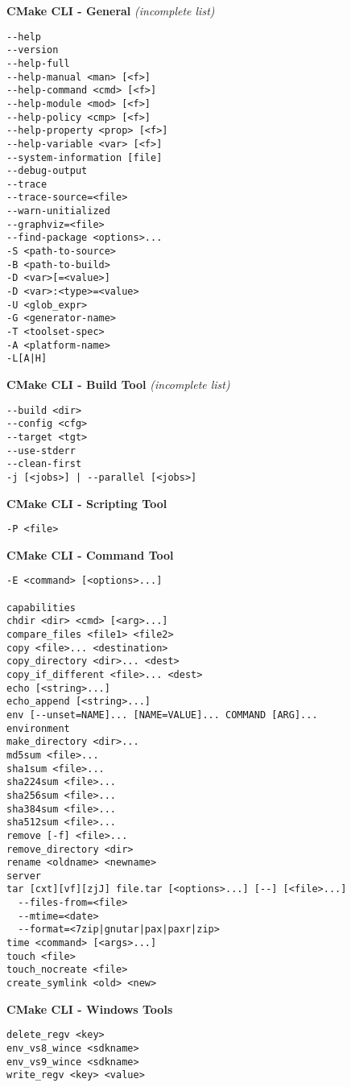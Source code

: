 \documentclass{article}
\begin{document}
\begin{minipage}[t]{0.18\linewidth}
\textbf{CMake CLI - General}
{\tiny \em (incomplete list)}
\begin{verbatim}
--help
--version
--help-full
--help-manual <man> [<f>]
--help-command <cmd> [<f>]
--help-module <mod> [<f>]
--help-policy <cmp> [<f>]
--help-property <prop> [<f>]
--help-variable <var> [<f>]
--system-information [file]
--debug-output
--trace
--trace-source=<file>
--warn-unitialized
--graphviz=<file>
--find-package <options>...
-S <path-to-source>
-B <path-to-build>
-D <var>[=<value>]
-D <var>:<type>=<value>
-U <glob_expr>
-G <generator-name>
-T <toolset-spec>
-A <platform-name>
-L[A|H]
\end{verbatim}
\textbf{CMake CLI - Build Tool}
{\tiny \em (incomplete list)}
\begin{verbatim}
--build <dir>
--config <cfg>
--target <tgt>
--use-stderr
--clean-first
-j [<jobs>] | --parallel [<jobs>]
\end{verbatim}
\textbf{CMake CLI - Scripting Tool}
\begin{verbatim}
-P <file>
\end{verbatim}
\textbf{CMake CLI - Command Tool}
\begin{verbatim}
-E <command> [<options>...]

capabilities
chdir <dir> <cmd> [<arg>...]
compare_files <file1> <file2>
copy <file>... <destination>
copy_directory <dir>... <dest>
copy_if_different <file>... <dest>
echo [<string>...]
echo_append [<string>...]
env [--unset=NAME]... [NAME=VALUE]... COMMAND [ARG]...
environment
make_directory <dir>...
md5sum <file>...
sha1sum <file>...
sha224sum <file>...
sha256sum <file>...
sha384sum <file>...
sha512sum <file>...
remove [-f] <file>...
remove_directory <dir>
rename <oldname> <newname>
server
tar [cxt][vf][zjJ] file.tar [<options>...] [--] [<file>...]
  --files-from=<file>
  --mtime=<date>
  --format=<7zip|gnutar|pax|paxr|zip>
time <command> [<args>...]
touch <file>
touch_nocreate <file>
create_symlink <old> <new>
\end{verbatim}
\textbf{CMake CLI - Windows Tools}
\begin{verbatim}
delete_regv <key>
env_vs8_wince <sdkname>
env_vs9_wince <sdkname>
write_regv <key> <value>
\end{verbatim}
\end{minipage}

\pagebreak
\end{document}
